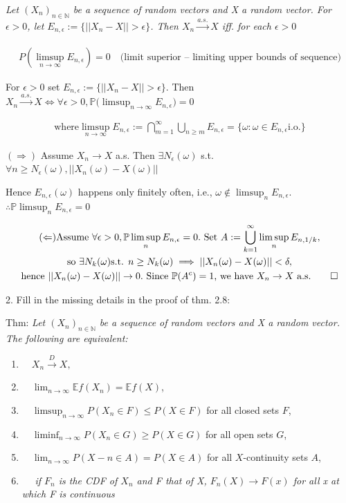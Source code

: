\documentclass[10pt]{article}
\begin{document}
\textit{Let $(X_n)_{n \in \mathbb{N}}$ be a sequence of random vectors and X a random vector. For $\epsilon > 0$, let $E_{n, \epsilon}:=\{||X_n - X|| > \epsilon\}$. Then $X_n \xrightarrow[]{a.s.} X$ iff. for each $\epsilon > 0$}

\begin{gather*}
    P(\limsup_{n \to \infty}E_{n, \epsilon}) = 0 \quad\text{(limit superior – limiting upper bounds of sequence)}
\end{gather*}

For $\epsilon > 0$ set $E_{n, \epsilon}:=\{||X_n - X|| > \epsilon\}$. Then $X_n \xrightarrow{a.s.} X \iff \forall\epsilon > 0, \mathbb{P}\Big(\limsup_{n \to \infty}E_{n, \epsilon}\Big) = 0$

\begin{gather*}
    \text{where} \limsup_{n \to \infty}E_{n, \epsilon}:= \bigcap_{m = 1}^\infty \bigcup_{n \geq m}E_{n, \epsilon} = \{\omega: \omega \in E_{n, \epsilon} \text{i.o.}\}
\end{gather*}

$(\Rightarrow)$ Assume $X_n \to X$ a.s. Then $\exists N_\epsilon(\omega)$ s.t. $\forall n \geq N_\epsilon(\omega), ||X_n(\omega) - X(\omega)||$

Hence $E_{n, \epsilon}(\omega)$ happens only finitely often, i.e., $\omega \notin \limsup_n E_{n, \epsilon}$. $\therefore \mathbb{P}\limsup_{n} E_{n, \epsilon} = 0$

\begin{gather*}
    (\Leftarrow) \text{Assume }\forall\epsilon > 0, \mathbb{P}\limsup_n E_{n, \epsilon} = 0. \text{ Set } A := \bigcup_{k = 1}^\infty \limsup_n E_{n, 1/k}, \\
    \text{so }\exists N_k(\omega) \text{s.t. } n \geq N_k(\omega) \implies ||X_n(\omega) - X(\omega)|| < \delta, \\
    \text{hence }||X_n(\omega) - X(\omega)|| \to 0. \text{ Since } \mathbb{P}(A^c) = 1 \text{, we have }X_n \to X \text{ a.s.} \qed
\end{gather*}

\newpage

2. Fill in the missing details in the proof of thm. 2.8:

Thm: \textit{Let $(X_n)_{n \in \mathbb{N}}$ be a sequence of random vectors and X a random vector. The following are equivalent: }

\begin{enumerate}[label=(\roman*)]
    \item $\quad X_n \xrightarrow{D} X,$
    \item $\quad \lim_{n \to \infty} \mathbb{E}f(X_n) = \mathbb{E}f(X)$,
    \item $\quad \limsup_{n \to \infty}P(X_n \in F) \leq P(X \in F)$ for all closed sets $F$,
    \item $\quad \liminf_{n \to \infty} P(X_n \in G) \geq P(X \in G)$ for all open sets $G$,
    \item $\quad \lim_{n \to \infty} P(X-n \in A) = P(X \in A)$ for all $X$-continuity sets $A$,
    \item $\quad$ \textit{if $F_n$ is the CDF of $X_n$ and F that of X, $F_n(X) \to F(x)$ for all x at which F is continuous}
\end{enumerate}
\end{document}
